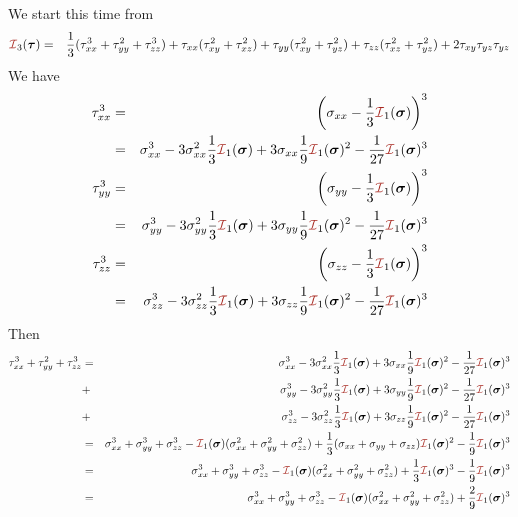 We start this time from
\begin{eqnarray}
{\III}_3(\bm\tau) 
&=& 
\frac{1}{3}(\tau_{xx}^3 + \tau_{yy}^2 + \tau_{zz}^3) 
+\tau_{xx}(\tau_{xy}^2 + \tau_{xz}^2 ) 
+\tau_{yy}(\tau_{xy}^2 + \tau_{yz}^2 ) 
+\tau_{zz}(\tau_{xz}^2 + \tau_{yz}^2 ) 
+2\tau_{xy}\tau_{yz}\tau_{yz} \nn
\end{eqnarray}
We have
\begin{eqnarray}
\tau_{xx}^3 
&=& \left(\sigma_{xx}-\frac13 {\III}_1(\bm\sigma) \right)^3 \nn\\
&=& \sigma_{xx}^3 - 3\sigma_{xx}^2 \frac13 {\III}_1(\bm\sigma) 
+ 3 \sigma_{xx} \frac19  {\III}_1(\bm\sigma)^2 - \frac{1}{27} {\III}_1(\bm\sigma)^3  \nn\\
\tau_{yy}^3 
&=& \left(\sigma_{yy}-\frac13 {\III}_1(\bm\sigma) \right)^3 \nn\\
&=& \sigma_{yy}^3 - 3\sigma_{yy}^2 \frac13 {\III}_1(\bm\sigma) 
+ 3 \sigma_{yy} \frac19  {\III}_1(\bm\sigma)^2 - \frac{1}{27} {\III}_1(\bm\sigma)^3  \nn\\
\tau_{zz}^3 
&=& \left(\sigma_{zz}-\frac13 {\III}_1(\bm\sigma) \right)^3 \nn\\
&=& \sigma_{zz}^3 - 3\sigma_{zz}^2 \frac13 {\III}_1(\bm\sigma) 
+ 3 \sigma_{zz} \frac19  {\III}_1(\bm\sigma)^2 - \frac{1}{27} {\III}_1(\bm\sigma)^3  \nn
\end{eqnarray}
Then 
\begin{eqnarray}
\tau_{xx}^3 + \tau_{yy}^2 + \tau_{zz}^3 
&=&
\sigma_{xx}^3 - 3\sigma_{xx}^2 \frac13 {\III}_1(\bm\sigma) 
+ 3 \sigma_{xx} \frac19  {\III}_1(\bm\sigma)^2 - \frac{1}{27} {\III}_1(\bm\sigma)^3  \nn\\
&+& \sigma_{yy}^3 - 3\sigma_{yy}^2 \frac13 {\III}_1(\bm\sigma) 
+ 3 \sigma_{yy} \frac19  {\III}_1(\bm\sigma)^2 - \frac{1}{27} {\III}_1(\bm\sigma)^3  \nn\\
&+& \sigma_{zz}^3 - 3\sigma_{zz}^2 \frac13 {\III}_1(\bm\sigma) 
+ 3 \sigma_{zz} \frac19  {\III}_1(\bm\sigma)^2 - \frac{1}{27} {\III}_1(\bm\sigma)^3 \nn\\
&=&
\sigma_{xx}^3 + \sigma_{yy}^3 + \sigma_{zz}^3
-{\III}_1(\bm\sigma) (\sigma_{xx}^2+\sigma_{yy}^2+\sigma_{zz}^2)
+\frac13 (\sigma_{xx} + \sigma_{yy} + \sigma_{zz}) {\III}_1(\bm\sigma)^2
-\frac19 {\III}_1(\bm\sigma)^3 \nn\\
&=&
\sigma_{xx}^3 + \sigma_{yy}^3 + \sigma_{zz}^3
-{\III}_1(\bm\sigma) (\sigma_{xx}^2+\sigma_{yy}^2+\sigma_{zz}^2)
+\frac13 {\III}_1(\bm\sigma)^3
-\frac19 {\III}_1(\bm\sigma)^3 \nn\\
&=&
\sigma_{xx}^3 + \sigma_{yy}^3 + \sigma_{zz}^3
-{\III}_1(\bm\sigma) (\sigma_{xx}^2+\sigma_{yy}^2+\sigma_{zz}^2)
+\frac29 {\III}_1(\bm\sigma)^3 \nn
\end{eqnarray}


